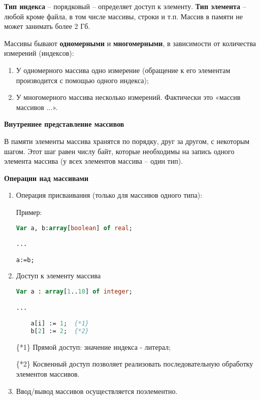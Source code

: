 
{\bf{Тип индекса}} – порядковый – определяет доступ к элементу. 
{\bf{Тип элемента}} – любой кроме файла, в том числе массивы, строки и т.п.
Массив в памяти не может занимать более 2 Гб. 


Массивы бывают {\bf{одномерными}} и {\bf{многомерными}}, в зависимости от количества измерений (индексов):
\begin{enumerate}
\item У одномерного массива одно измерение (обращение к его элементам производится с помощью одного индекса);

\item У многомерного массива несколько измерений. Фактически это «массив массивов ...».
\end{enumerate}

{\bf{Внутреннее представление массивов}}

В памяти элементы массива хранятся по порядку, друг за другом, с некоторым шагом. Этот шаг равен числу байт, которые необходимы на запись одного элемента массива (у всех элементов массива – один тип).

{\bf{Операции над массивами}}

\begin{enumerate}
\item Операция присваивания (только для массивов одного типа):

Пример:

\begin{lstlisting}[language=Pascal]
Var a, b:array[boolean] of real;

... 

a:=b; 
\end{lstlisting}

\item Доступ к элементу массива

\begin{lstlisting}[language=Pascal]
Var a : array[1..10] of integer;

... 

	a[i] := 1;  {*1} 
	b[2] := 2;  {*2}
\end{lstlisting}
\{*1\} Прямой доступ: значение индекса - литерал;

\{*2\} Косвенный доступ позволяет реализовать последовательную обработку элементов массивов.

\item Ввод/вывод массивов осуществляется поэлементно.

\end{enumerate}


